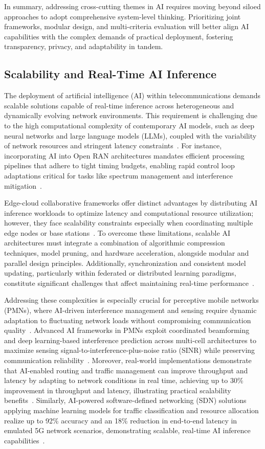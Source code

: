\documentclass[sigconf]{acmart}
\begin{document}
In summary, addressing cross-cutting themes in AI requires moving beyond siloed approaches to adopt comprehensive system-level thinking. Prioritizing joint frameworks, modular design, and multi-criteria evaluation will better align AI capabilities with the complex demands of practical deployment, fostering transparency, privacy, and adaptability in tandem.

\subsection{Scalability and Real-Time AI Inference}

The deployment of artificial intelligence (AI) within telecommunications demands scalable solutions capable of real-time inference across heterogeneous and dynamically evolving network environments. This requirement is challenging due to the high computational complexity of contemporary AI models, such as deep neural networks and large language models (LLMs), coupled with the variability of network resources and stringent latency constraints~\cite{ref7,ref49,ref52,ref53}. For instance, incorporating AI into Open RAN architectures mandates efficient processing pipelines that adhere to tight timing budgets, enabling rapid control loop adaptations critical for tasks like spectrum management and interference mitigation~\cite{ref48}. 

Edge-cloud collaborative frameworks offer distinct advantages by distributing AI inference workloads to optimize latency and computational resource utilization; however, they face scalability constraints especially when coordinating multiple edge nodes or base stations~\cite{ref49}. To overcome these limitations, scalable AI architectures must integrate a combination of algorithmic compression techniques, model pruning, and hardware acceleration, alongside modular and parallel design principles. Additionally, synchronization and consistent model updating, particularly within federated or distributed learning paradigms, constitute significant challenges that affect maintaining real-time performance~\cite{ref52}. 

Addressing these complexities is especially crucial for perceptive mobile networks (PMNs), where AI-driven interference management and sensing require dynamic adaptation to fluctuating network loads without compromising communication quality~\cite{ref53}. Advanced AI frameworks in PMNs exploit coordinated beamforming and deep learning-based interference prediction across multi-cell architectures to maximize sensing signal-to-interference-plus-noise ratio (SINR) while preserving communication reliability~\cite{ref48}. Moreover, real-world implementations demonstrate that AI-enabled routing and traffic management can improve throughput and latency by adapting to network conditions in real time, achieving up to 30\% improvement in throughput and latency, illustrating practical scalability benefits~\cite{ref53}. Similarly, AI-powered software-defined networking (SDN) solutions applying machine learning models for traffic classification and resource allocation realize up to 92\% accuracy and an 18\% reduction in end-to-end latency in emulated 5G network scenarios, demonstrating scalable, real-time AI inference capabilities~\cite{ref52}.
\end{document}
